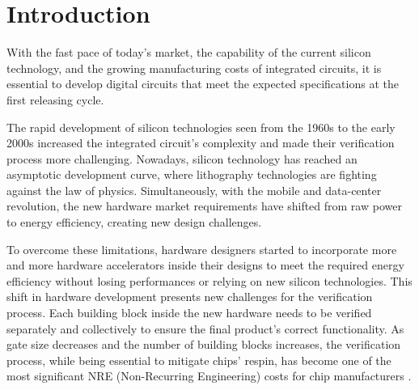 



\chapter{Introduction}
With the fast pace of today's market, the capability of the current silicon
technology, and the growing manufacturing costs of integrated circuits, it is
essential to develop digital circuits that meet the expected specifications at
the first releasing cycle.

The rapid development of silicon technologies seen from the 1960s to the early
2000s increased the integrated circuit's complexity and made their verification
process more challenging. Nowadays, silicon technology has reached an asymptotic
development curve, where lithography technologies are fighting against the law
of physics. Simultaneously, with the mobile and data-center revolution, the new
hardware market requirements have shifted from raw power to energy efficiency,
creating new design challenges.

To overcome these limitations, hardware designers started to incorporate more
and more hardware accelerators inside their designs to meet the required energy
efficiency without losing performances or relying on new silicon technologies.
This shift in hardware development presents new challenges for the verification
process. Each building block inside the new hardware needs to be verified
separately and collectively to ensure the final product's correct functionality.
As gate size decreases and the number of building blocks increases, the
verification process, while being essential to mitigate chips' respin, has
become one of the most significant NRE (Non-Recurring Engineering) costs for
chip manufacturers \cite{whydesingmustchange}.

